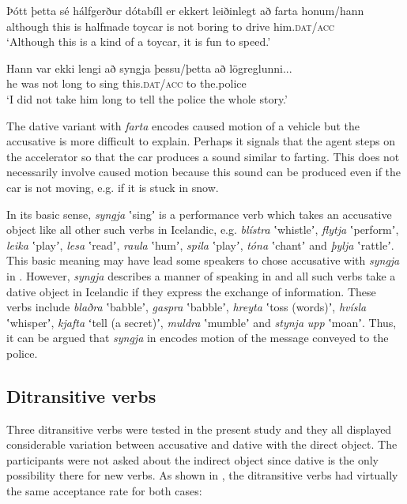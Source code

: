 \documentclass[output=paper,modfonts,nonflat,colorlinks,citecolor=brown]{langsci/langscibook}
\begin{document}
{\ea
    \label{ex:jonsson:8}
\ea%
\gll  Þótt  þetta  sé  hálfgerður  dótabíll  er  ekkert  leiðinlegt  að  farta  honum/hann\\
   although  this  is  halfmade  toycar  is  not  boring  to  drive  him.\textsc{dat/acc}\\
\glt `Although this is a kind of a toycar, it is fun to speed.'

\ex  \label{ex:jonsson:8b}
\gll   Hann  var  ekki  lengi  að  syngja  þessu/þetta  að  lögreglunni...  \\
 he  was  not  long  to  sing  this.\textsc{dat/acc}  to  the.police  \\
\glt `I did not take him long to tell the police the whole story.'
\z
\z

The dative variant with \textit{farta} encodes caused motion of a vehicle but the accusative is more difficult to explain. Perhaps it signals that the agent steps on the accelerator so that the car produces a sound similar to farting. This does not necessarily involve caused motion because this sound can be produced even if the car is not moving, e.g. if it is stuck in snow. 

In its basic sense, \textit{syngja} ʽsingʼ is a performance verb which takes an accusative object like all other such verbs in Icelandic, e.g. \textit{blístra} ʽwhistleʼ, \textit{flytja} ʽperformʼ, \textit{leika} ʽplayʼ, \textit{lesa} ʽreadʼ, \textit{raula} ʽhumʼ, \textit{spila} ʽplayʼ, \textit{tóna} ʽchantʼ and \textit{þylja} ʽrattleʼ. This basic meaning may have lead some speakers to chose accusative with \textit{syngja} in . However, \textit{syngja} describes a manner of speaking in  and all such verbs take a dative object in Icelandic if they express the exchange of information. These verbs include \textit{blaðra} ʽbabbleʼ,  \textit{gaspra} ʽbabbleʼ, \textit{hreyta} ʽtoss (words)ʼ, \textit{hvísla} ʽwhisperʼ, \textit{kjafta} ʻtell (a secret)ʼ, \textit{muldra} ʽmumbleʼ and \textit{stynja} \textit{upp} ʽmoanʼ. Thus, it can be argued that \textit{syngja} in  encodes motion of the message conveyed to the police. 

\subsection{Ditransitive verbs} %

Three ditransitive verbs were tested in the present study and they all displayed considerable variation between accusative and dative with the direct object. The participants were not asked about the indirect object since dative is the only possibility there for new verbs. As shown in , the ditransitive verbs had virtually the same acceptance rate for both cases:

}
\end{document}
